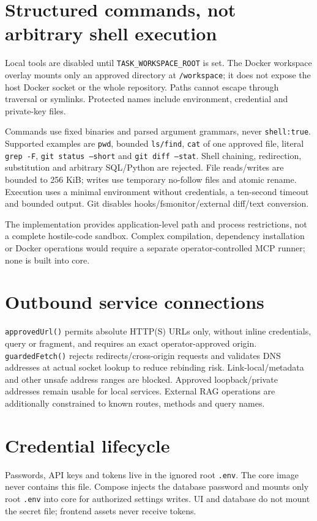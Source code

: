 \section*{Structured commands, not arbitrary shell execution}
Local tools are disabled until \texttt{TASK\_WORKSPACE\_ROOT} is set. The Docker workspace overlay mounts only an approved directory at \texttt{/workspace}; it does not expose the host Docker socket or the whole repository. Paths cannot escape through traversal or symlinks. Protected names include environment, credential and private-key files.

Commands use fixed binaries and parsed argument grammars, never \texttt{shell:true}. Supported examples are \texttt{pwd}, bounded \texttt{ls/find}, \texttt{cat} of one approved file, literal \texttt{grep -F}, \texttt{git status --short} and \texttt{git diff --stat}. Shell chaining, redirection, substitution and arbitrary SQL/Python are rejected. File reads/writes are bounded to 256 KiB; writes use temporary no-follow files and atomic rename. Execution uses a minimal environment without credentials, a ten-second timeout and bounded output. Git disables hooks/fsmonitor/external diff/text conversion.

The implementation provides application-level path and process restrictions, not a complete hostile-code sandbox. Complex compilation, dependency installation or Docker operations would require a separate operator-controlled MCP runner; none is built into core.
\section*{Outbound service connections}
\texttt{approvedUrl()} permits absolute HTTP(S) URLs only, without inline credentials, query or fragment, and requires an exact operator-approved origin. \texttt{guardedFetch()} rejects redirects/cross-origin requests and validates DNS addresses at actual socket lookup to reduce rebinding risk. Link-local/metadata and other unsafe address ranges are blocked. Approved loopback/private addresses remain usable for local services. External RAG operations are additionally constrained to known routes, methods and query names.
\section*{Credential lifecycle}
Passwords, API keys and tokens live in the ignored root \texttt{.env}. The core image never contains this file. Compose injects the database password and mounts only root \texttt{.env} into core for authorized settings writes. UI and database do not mount the secret file; frontend assets never receive tokens.


